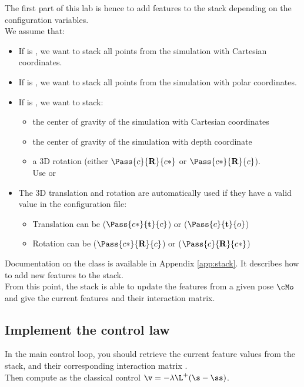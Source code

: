 \documentclass{ecnreport}
\begin{document}
The first part of this lab is hence to add features to the stack depending on the configuration variables.\\
We assume that:
\begin{itemize}
 \item If  is , we want to stack all points from the simulation with Cartesian coordinates.
 \item If  is , we want to stack all points from the simulation with polar coordinates.
 \item If  is , we want to stack:
 \begin{itemize}
  \item the center of gravity of the simulation with Cartesian coordinates
  \item the center of gravity of the simulation with depth coordinate
  \item a 3D rotation (either $\Pass{c}{\mathbf{R}}{c*}$ or $\Pass{c*}{\mathbf{R}}{c}$).\\Use {} or 
 \end{itemize}
 \item The 3D translation and rotation are automatically used if they have a valid value in the configuration file:
 \begin{itemize}
  \item Translation can be  ($\Pass{c*}{\mathbf{t}}{c}$) or  ($\Pass{c}{\mathbf{t}}{o}$)
  \item Rotation can be   ($\Pass{c*}{\mathbf{R}}{c}$) or  ($\Pass{c}{\mathbf{R}}{c*}$)
 \end{itemize}
\end{itemize}
Documentation on the  class is available in Appendix \ref{app:stack}. It describes how to add new features to the stack.\\

From this point, the stack is able to update the features from a given pose $\cMo$ and give the current features and their interaction matrix.

\subsection{Implement the control law}

In the main control loop, you should retrieve the current feature values  from the stack, and their corresponding interaction matrix .\\
Then compute  as the classical control $\v = -\lambda\L^+(\s-\ss)$.\\
\end{document}
